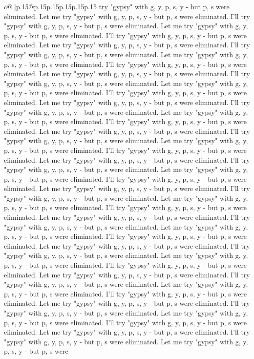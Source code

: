 \documentclass{article}
\begin{document}
{\begin{supertabular}{c@{$\;$}|p{.15\linewidth}@{}p{.15\linewidth}p{.15\linewidth}p{.15\linewidth}p{.15\linewidth}p{.15\linewidth}}
{{{try "gypsy" with g, y, p, s, y {-} but p, s were eliminated. Let me try "gypsy" with g, y, p, s, y {-} but p, s were eliminated. I'll try "gypsy" with g, y, p, s, y {-} but p, s were eliminated. Let me try "gypsy" with g, y, p, s, y {-} but p, s were eliminated. I'll try "gypsy" with g, y, p, s, y {-} but p, s were eliminated. Let me try "gypsy" with g, y, p, s, y {-} but p, s were eliminated. I'll try "gypsy" with g, y, p, s, y {-} but p, s were eliminated. Let me try "gypsy" with g, y, p, s, y {-} but p, s were eliminated. I'll try "gypsy" with g, y, p, s, y {-} but p, s were eliminated. Let me try "gypsy" with g, y, p, s, y {-} but p, s were eliminated. I'll try "gypsy" with g, y, p, s, y {-} but p, s were eliminated. Let me try "gypsy" with g, y, p, s, y {-} but p, s were eliminated. I'll try "gypsy" with g, y, p, s, y {-} but p, s were eliminated. Let me try "gypsy" with g, y, p, s, y {-} but p, s were eliminated. I'll try "gypsy" with g, y, p, s, y {-} but p, s were eliminated. Let me try "gypsy" with g, y, p, s, y {-} but p, s were eliminated. I'll try "gypsy" with g, y, p, s, y {-} but p, s were eliminated. Let me try "gypsy" with g, y, p, s, y {-} but p, s were eliminated. I'll try "gypsy" with g, y, p, s, y {-} but p, s were eliminated. Let me try "gypsy" with g, y, p, s, y {-} but p, s were eliminated. I'll try "gypsy" with g, y, p, s, y {-} but p, s were eliminated. Let me try "gypsy" with g, y, p, s, y {-} but p, s were eliminated. I'll try "gypsy" with g, y, p, s, y {-} but p, s were eliminated. Let me try "gypsy" with g, y, p, s, y {-} but p, s were eliminated. I'll try "gypsy" with g, y, p, s, y {-} but p, s were eliminated. Let me try "gypsy" with g, y, p, s, y {-} but p, s were eliminated. I'll try "gypsy" with g, y, p, s, y {-} but p, s were eliminated. Let me try "gypsy" with g, y, p, s, y {-} but p, s were eliminated. I'll try "gypsy" with g, y, p, s, y {-} but p, s were eliminated. Let me try "gypsy" with g, y, p, s, y {-} but p, s were eliminated. I'll try "gypsy" with g, y, p, s, y {-} but p, s were eliminated. Let me try "gypsy" with g, y, p, s, y {-} but p, s were eliminated. I'll try "gypsy" with g, y, p, s, y {-} but p, s were eliminated. Let me try "gypsy" with g, y, p, s, y {-} but p, s were eliminated. I'll try "gypsy" with g, y, p, s, y {-} but p, s were eliminated. Let me try "gypsy" with g, y, p, s, y {-} but p, s were eliminated. I'll try "gypsy" with g, y, p, s, y {-} but p, s were eliminated. Let me try "gypsy" with g, y, p, s, y {-} but p, s were eliminated. I'll try "gypsy" with g, y, p, s, y {-} but p, s were eliminated. Let me try "gypsy" with g, y, p, s, y {-} but p, s were eliminated. I'll try "gypsy" with g, y, p, s, y {-} but p, s were eliminated. Let me try "gypsy" with g, y, p, s, y {-} but p, s were eliminated. I'll try "gypsy" with g, y, p, s, y {-} but p, s were eliminated. Let me try "gypsy" with g, y, p, s, y {-} but p, s were eliminated. I'll try "gypsy" with g, y, p, s, y {-} but p, s were eliminated. Let me try "gypsy" with g, y, p, s, y {-} but p, s were eliminated. I'll try "gypsy" with g, y, p, s, y {-} but p, s were eliminated. Let me try "gypsy" with g, y, p, s, y {-} but p, s were }}}
\end{supertabular}}
\end{document}
